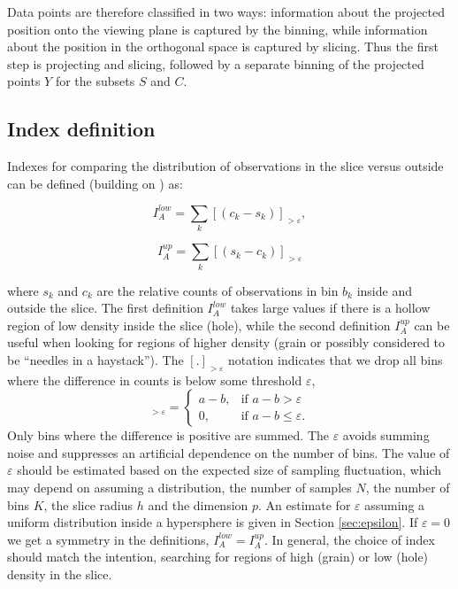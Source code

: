 \documentclass[]{interact}
\theoremstyle{plain}%
\theoremstyle{definition}
\theoremstyle{remark}
\begin{document}
Data points are therefore classified in two ways: information about the
projected position onto the viewing plane is captured by the binning,
while information about the position in the orthogonal space is captured
by slicing. Thus the first step is projecting and slicing, followed by a
separate binning of the projected points \(Y\) for the subsets \(S\) and
\(C\).

\hypertarget{index-definition}{%
\subsection{Index definition}\label{index-definition}}

Indexes for comparing the distribution of observations in the slice
versus outside can be defined (building on
\citet{doi:10.1198/1061860043119}) as:

\begin{equation}
I_A^{low} = \sum_{k}\left[\left(c_{k}-s_{k}\right)\right]_{>\varepsilon},
\label{eq:index}
\end{equation}

\begin{equation}
I_A^{up} = \sum_{k}\left[\left(s_{k}-c_{k}\right)\right]_{>\varepsilon}
\label{eq:indexup}
\end{equation}

\noindent where \(s_{k}\) and \(c_{k}\) are the relative counts of
observations in bin \(b_{k}\) inside and outside the slice. The first
definition \(I_A^{low}\) takes large values if there is a hollow region
of low density inside the slice (hole), while the second definition
\(I_A^{up}\) can be useful when looking for regions of higher density
(grain or possibly considered to be ``needles in a haystack''). The
\([.]_{>\varepsilon}\) notation indicates that we drop all bins where
the difference in counts is below some threshold \(\varepsilon\),
\begin{equation}
[a - b]_{>\varepsilon} = \begin{cases}
    a - b, & \text{if $a - b > \varepsilon$}\\
    0, & \text{if $a-b \leq \varepsilon$.}
  \end{cases}
\end{equation} Only bins where the difference is positive are summed.
The \(\varepsilon\) avoids summing noise and suppresses an artificial
dependence on the number of bins. The value of \(\varepsilon\) should be
estimated based on the expected size of sampling fluctuation, which may
depend on assuming a distribution, the number of samples \(N\), the
number of bins \(K\), the slice radius \(h\) and the dimension \(p\). An
estimate for \(\varepsilon\) assuming a uniform distribution inside a
hypersphere is given in Section \ref{sec:epsilon}. If \(\varepsilon=0\)
we get a symmetry in the definitions, \(I_A^{low}=I_A^{up}\). In
general, the choice of index should match the intention, searching for
regions of high (grain) or low (hole) density in the slice.
\end{document}
